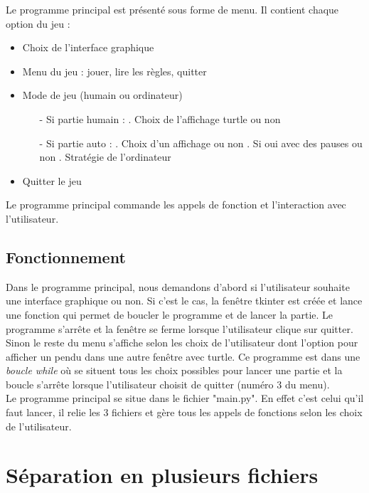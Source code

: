 \documentclass[french,10pt,a4paper]{article}	%
\begin{document}
	
	Le programme principal est présenté sous forme de menu. Il contient chaque option du jeu :
	
	\begin{itemize}
	\item Choix de l'interface graphique
	\item Menu du jeu : jouer, lire les règles, quitter
	\item Mode de jeu (humain ou ordinateur)
		\begin{itemize}		
		\item[-] Si partie humain :
			\subitem . Choix de l'affichage turtle ou non
		\item[-] Si partie auto :		
			\subitem . Choix d'un affichage ou non
			\subitem . Si oui avec des pauses ou non
			\subitem . Stratégie de l'ordinateur
		\end{itemize}	
	\item Quitter le jeu	
	\end{itemize}
	
	Le programme principal commande les appels de fonction et l'interaction avec l'utilisateur.
		
	\subsection{Fonctionnement}
	
	
	Dans le programme principal, nous demandons d'abord si l'utilisateur souhaite une interface graphique ou non. Si c'est le cas, la fenêtre tkinter est créée et lance une fonction qui permet de boucler le programme et de lancer la partie. Le programme s'arrête et la fenêtre se ferme lorsque l'utilisateur clique sur quitter.\\ 
	Sinon le reste du menu s'affiche selon les choix de l'utilisateur dont l'option pour afficher un pendu dans une autre fenêtre avec turtle. Ce programme est dans une \textit{boucle while} où se situent tous les choix possibles pour lancer une partie et la boucle s'arrête lorsque l'utilisateur choisit de quitter (numéro 3 du menu).\\
Le programme principal se situe dans le fichier "main.py". En effet c'est celui qu'il faut lancer, il relie les 3 fichiers et gère tous les appels de fonctions selon les choix de l'utilisateur.

\section{Séparation en plusieurs fichiers}
\end{document}

